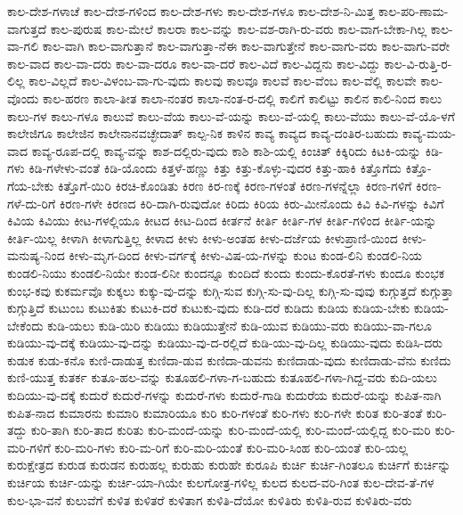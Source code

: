 {ಕಾಲ-ದೇಶ-ಗಳಾಚೆ
ಕಾಲ-ದೇಶ-ಗಳಿಂದ
ಕಾಲ-ದೇಶ-ಗಳು
ಕಾಲ-ದೇಶ-ಗಳೂ
ಕಾಲ-ದೇಶ-ನಿ-ಮಿತ್ತ
ಕಾಲ-ಪರಿ-ಣಾಮ-ವಾಗುತ್ತದೆ
ಕಾಲ-ಪುರುಷ
ಕಾಲ-ಮೇಲೆ
ಕಾಲರಾ
ಕಾಲ-ವನ್ನು
ಕಾಲ-ವಶ-ರಾಗಿ-ರು-ವರು
ಕಾಲ-ವಾಗ-ಬೇಕಾ-ಗಿಲ್ಲ
ಕಾಲ-ವಾ-ಗಲಿ
ಕಾಲ-ವಾಗಿ
ಕಾಲ-ವಾಗುತ್ತಾನೆ
ಕಾಲ-ವಾಗುತ್ತಾ-ನೆಈ
ಕಾಲ-ವಾಗುತ್ತೇನೆ
ಕಾಲ-ವಾಗು-ವರು
ಕಾಲ-ವಾಗು-ವರೇ
ಕಾಲ-ವಾದ
ಕಾಲ-ವಾ-ದರು
ಕಾಲ-ವಾ-ದರೂ
ಕಾಲ-ವಾ-ದರೆ
ಕಾಲ-ವಿದೆ
ಕಾಲ-ವಿದ್ದನು
ಕಾಲ-ವಿದ್ದು
ಕಾಲ-ವಿ-ರುತ್ತಿ-ರ-ಲಿಲ್ಲ
ಕಾಲ-ವಿಲ್ಲದೆ
ಕಾಲ-ವಿಳಂಬ-ವಾ-ಗು-ವುದು
ಕಾಲವು
ಕಾಲವೂ
ಕಾಲವೆ
ಕಾಲ-ವೆಂಬ
ಕಾಲ-ವೆಲ್ಲಿ
ಕಾಲವೇ
ಕಾಲ-ವೊಂದು
ಕಾಲ-ಹರಣ
ಕಾಲಾ-ತೀತ
ಕಾಲಾ-ನಂತರ
ಕಾಲಾ-ನಂತ-ರ-ದಲ್ಲಿ
ಕಾಲಿಗೆ
ಕಾಲಿಟ್ಟು
ಕಾಲಿನ
ಕಾಲಿ-ನಿಂದ
ಕಾಲು
ಕಾಲು-ಗಳ
ಕಾಲು-ಗಳೂ
ಕಾಲುವೆ
ಕಾಲು-ವೆಯ
ಕಾಲು-ವೆ-ಯನ್ನು
ಕಾಲು-ವೆ-ಯಲ್ಲಿ
ಕಾಲು-ವೆಯು
ಕಾಲು-ವೆ-ಯೊ-ಳಗೆ
ಕಾಲೇಜಿಗೂ
ಕಾಲೇಜಿನ
ಕಾಲೇನಾನವಚ್ಛೇದಾತ್
ಕಾಲ್ಪ-ನಿಕ
ಕಾಳಿನ
ಕಾವ್ಯ
ಕಾವ್ಯದ
ಕಾವ್ಯ-ದಂತಿರ-ಬಹುದು
ಕಾವ್ಯ-ಮಯ-ವಾದ
ಕಾವ್ಯ-ರೂಪ-ದಲ್ಲಿ
ಕಾವ್ಯ-ವನ್ನು
ಕಾಶ-ದಲ್ಲಿರು-ವುದು
ಕಾಶಿ
ಕಾಶಿ-ಯಲ್ಲಿ
ಕಿಂಚಿತ್
ಕಿಕ್ಕಿರಿದು
ಕಿಟಕಿ-ಯನ್ನು
ಕಿಡಿ-ಗಳು
ಕಿಡಿ-ಗಳೇಳು-ವಂತೆ
ಕಿಡಿ-ಯೊಂದು
ಕಿತ್ತಳೆ-ಹಣ್ಣು
ಕಿತ್ತು
ಕಿತ್ತು-ಕೊಳ್ಳು-ವುದರ
ಕಿತ್ತು-ಹಾಕಿ
ಕಿತ್ತೊಗೆದು
ಕಿತ್ತೊ-ಗೆಯ-ಬೇಕು
ಕಿತ್ತೊಗೆ-ಯಿರಿ
ಕಿರಚಿ-ಕೊಂಡಿತು
ಕಿರಣ
ಕಿರ-ಣಕ್ಕೆ
ಕಿರಣ-ಗಳಂತೆ
ಕಿರಣ-ಗಳನ್ನೆಲ್ಲಾ
ಕಿರಣ-ಗಳಿಗೆ
ಕಿರಣ-ಗಳೆ-ದು-ರಿಗೆ
ಕಿರಣ-ಗಳೇ
ಕಿರಣದ
ಕಿರಿ-ದಾಗಿ-ರುವುದೋ
ಕಿರಿದು
ಕಿರಿಯ
ಕಿರು-ಮೀನೊಂದು
ಕಿವಿ
ಕಿವಿ-ಗಳನ್ನು
ಕಿವಿಗೆ
ಕಿವಿಯ
ಕಿವಿಯು
ಕೀಟ-ಗಳಲ್ಲಿಯೂ
ಕೀಟದ
ಕೀಟ-ದಿಂದ
ಕೀರ್ತನೆ
ಕೀರ್ತಿ
ಕೀರ್ತಿ-ಗಳ
ಕೀರ್ತಿ-ಗಳಿಂದ
ಕೀರ್ತಿ-ಯನ್ನು
ಕೀರ್ತಿ-ಯಿಲ್ಲ
ಕೀಳಾಗಿ
ಕೀಳಾಗುತ್ತಿಲ್ಲ
ಕೀಳಾದ
ಕೀಳು
ಕೀಳು-ಅಂತಹ
ಕೀಳು-ದರ್ಜೆಯ
ಕೀಳುಪ್ರಾಣಿ-ಯಿಂದ
ಕೀಳು-ಮನುಷ್ಯ-ನಿಂದ
ಕೀಳು-ಮೃಗ-ದಿಂದ
ಕೀಳು-ವರ್ಗಕ್ಕೆ
ಕೀಳು-ವಿಷ-ಯ-ಗಳನ್ನು
ಕುಂಟ
ಕುಂಡ-ಲಿನಿ
ಕುಂಡಲಿ-ನಿಯ
ಕುಂಡಲಿ-ನಿಯು
ಕುಂಡಲಿ-ನಿಯೇ
ಕುಂಡ-ಲಿನೀ
ಕುಂದನ್ನೂ
ಕುಂದಿದೆ
ಕುಂದು
ಕುಂದು-ಕೊರತೆ-ಗಳು
ಕುಂದೂ
ಕುಂಭಕ
ಕುಂಭ-ಕವು
ಕುಕರ್ಮವೊ
ಕುಕ್ಕಲು
ಕುಕ್ಕು-ವು-ದನ್ನು
ಕುಗ್ಗಿ-ಸುವ
ಕುಗ್ಗಿ-ಸು-ವು-ದಿಲ್ಲ
ಕುಗ್ಗಿ-ಸು-ವುವು
ಕುಗ್ಗುತ್ತದೆ
ಕುಗ್ಗುತ್ತಾ
ಕುಗ್ಗುತ್ತಿದೆ
ಕುಟುಂಬ
ಕುಟುಕಿತು
ಕುಟುಕಿ-ದರೆ
ಕುಟುಕು-ವುದು
ಕುಡಿ-ದರೆ
ಕುಡಿದು
ಕುಡಿಯ
ಕುಡಿಯ-ಬೇಕು
ಕುಡಿಯ-ಬೇಕೆಂದು
ಕುಡಿ-ಯಲು
ಕುಡಿ-ಯಿರಿ
ಕುಡಿಯು
ಕುಡಿಯುತ್ತೇನೆ
ಕುಡಿ-ಯುವ
ಕುಡಿಯು-ವರು
ಕುಡಿಯು-ವಾ-ಗಲೂ
ಕುಡಿಯು-ವು-ದಕ್ಕೆ
ಕುಡಿಯು-ವು-ದನ್ನು
ಕುಡಿಯು-ವು-ದ-ರಲ್ಲಿದೆ
ಕುಡಿ-ಯು-ವು-ದಿಲ್ಲ
ಕುಡಿಯು-ವುದು
ಕುಡಿಸಿ-ದರು
ಕುಡುಕ
ಕುಡು-ಕನೊ
ಕುಣಿ-ದಾಡುತ್ತ
ಕುಣಿದಾ-ಡುವ
ಕುಣಿದಾ-ಡುವನು
ಕುಣಿದಾಡು-ವುದು
ಕುಣಿದಾಡು-ವೆನು
ಕುಣಿದು
ಕುಣಿ-ಯುತ್ತ
ಕುತರ್ಕ
ಕುತೂ-ಹಲ-ವನ್ನು
ಕುತೂಹಲಿ-ಗಳಾ-ಗ-ಬಹುದು
ಕುತೂಹಲಿ-ಗಳಾ-ಗಿದ್ದ-ವರು
ಕುದಿ-ಯಲು
ಕುದಿಯು-ವು-ದಕ್ಕೆ
ಕುದುರೆ
ಕುದುರೆ-ಗಳನ್ನು
ಕುದುರೆ-ಗಳು
ಕುದುರೆ-ಗಾಡಿ
ಕುದುರೆಯ
ಕುದುರೆ-ಯನ್ನು
ಕುಪಿತ-ನಾಗಿ
ಕುಪಿತ-ನಾದ
ಕುಮಾರನು
ಕುಮಾರಿ
ಕುಮಾರಿಯೂ
ಕುರಿ
ಕುರಿ-ಗಳಂತೆ
ಕುರಿ-ಗಳು
ಕುರಿ-ಗಳೇ
ಕುರಿತ
ಕುರಿ-ತಂತೆ
ಕುರಿ-ತದ್ದು
ಕುರಿ-ತಾಗಿ
ಕುರಿ-ತಾದ
ಕುರಿತು
ಕುರಿ-ಮಂದೆ-ಯನ್ನು
ಕುರಿ-ಮಂದೆ-ಯಲ್ಲಿ
ಕುರಿ-ಮಂದೆ-ಯಲ್ಲಿದ್ದ
ಕುರಿ-ಮರಿ
ಕುರಿ-ಮರಿ-ಗಳಿಗೆ
ಕುರಿ-ಮರಿ-ಗಳು
ಕುರಿ-ಮ-ರಿಗೆ
ಕುರಿ-ಮರಿ-ಯಂತೆ
ಕುರಿ-ಮರಿ-ಸಿಂಹ
ಕುರಿ-ಯಂತೆ
ಕುರಿ-ಯಲ್ಲ
ಕುರುಕ್ಷೇತ್ರದ
ಕುರುಡ
ಕುರುಡನ
ಕುರುಹಲ್ಲ
ಕುರುಹು
ಕುರುಹೇ
ಕುರೂಪಿ
ಕುರ್ಚಿ
ಕುರ್ಚಿ-ಗಿಂತಲೂ
ಕುರ್ಚಿಗೆ
ಕುರ್ಚಿನ್ನು
ಕುರ್ಚಿಯ
ಕುರ್ಚಿ-ಯನ್ನು
ಕುರ್ಚಿ-ಯಾ-ಗಿಯೇ
ಕುಲಗೋತ್ರ-ಗಳಿಲ್ಲ
ಕುಲದ
ಕುಲದ-ವರಿ-ಗಿಂತ
ಕುಲ-ದೇವ-ತೆ-ಗಳ
ಕುಲ-ಭಾ-ವನೆ
ಕುಲುವೆಗೆ
ಕುಳಿತ
ಕುಳಿತರೆ
ಕುಳಿತಾಗ
ಕುಳಿತಿ-ದೆಯೋ
ಕುಳಿತಿರು
ಕುಳಿತಿ-ರುವ
ಕುಳಿತಿರು-ವರು
}
